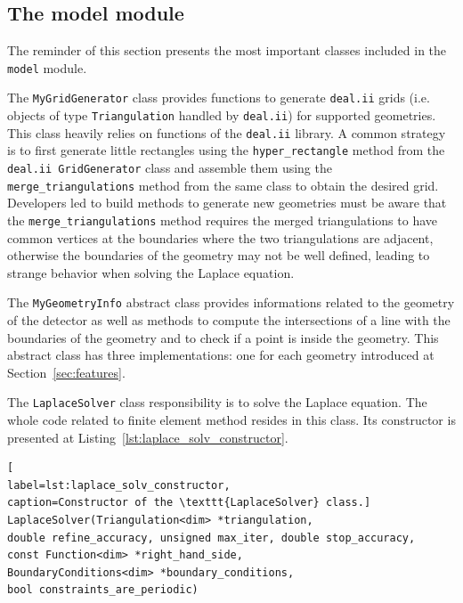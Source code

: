 \documentclass[11pt]{article}
\begin{document}
	\subsection{The model module}

		The reminder of this section presents the most important classes
		included in the \texttt{model} module.



		The \texttt{MyGridGenerator} class provides functions to generate \texttt{deal.ii}
		grids (i.e. objects of type \texttt{Triangulation} handled by \texttt{deal.ii}) for supported
		geometries. This class heavily relies on functions of the \texttt{deal.ii}
		library. A common strategy is to first generate
		little rectangles using the \lstinline{hyper_rectangle} method from the
		\texttt{deal.ii GridGenerator} class and assemble them using the \lstinline{merge_triangulations}
		method from the same class to obtain the desired grid. Developers led to build
		methods to generate
		new geometries must be aware that the \lstinline{merge_triangulations} method
		requires the merged triangulations to have common vertices at the boundaries
		where the two triangulations are adjacent, otherwise
		the boundaries of the geometry may not be well defined, leading to strange behavior
		when solving the Laplace equation.

		The \texttt{MyGeometryInfo} abstract class provides informations
		related to the
		geometry of the detector as well as methods to compute the intersections of a
		line with the boundaries of the geometry and to check if a point is inside
		the geometry. This abstract class has three implementations: one for each
		geometry introduced at Section~\ref{sec:features}.

		The \texttt{LaplaceSolver} class responsibility is to solve the Laplace equation.
		The whole code related to finite element method resides in this class.
		Its constructor is presented at Listing~\ref{lst:laplace_solv_constructor}.
		\newline

		\begin{lstlisting}[
label=lst:laplace_solv_constructor,
caption=Constructor of the \texttt{LaplaceSolver} class.]
LaplaceSolver(Triangulation<dim> *triangulation,
double refine_accuracy, unsigned max_iter, double stop_accuracy,
const Function<dim> *right_hand_side,
BoundaryConditions<dim> *boundary_conditions,
bool constraints_are_periodic)
		\end{lstlisting}
\end{document}
